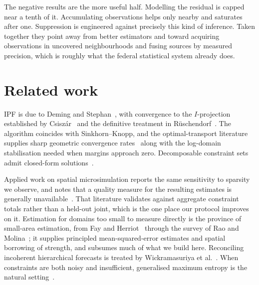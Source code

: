 \documentclass[11pt]{article}
\begin{document}
The negative results are the more useful half. Modelling the residual is capped
near a tenth of it. Accumulating observations helps only nearby and saturates
after one. Suppression is engineered against precisely this kind of inference.
Taken together they point away from better estimators and toward acquiring
observations in uncovered neighbourhoods and fusing sources by measured
precision, which is roughly what the federal statistical system already does.

\section{Related work}

IPF is due to Deming and Stephan~\cite{deming1940}, with convergence to the
$I$-projection established by Csisz\'ar~\cite{csiszar1975} and the definitive
treatment in R\"uschendorf~\cite{ruschendorf1995}. The algorithm coincides with
Sinkhorn--Knopp, and the optimal-transport literature supplies sharp geometric
convergence rates~\cite{sinkhornrate} along with the log-domain stabilisation
needed when margins approach zero. Decomposable constraint sets admit closed-form
solutions~\cite{decomposable}.

Applied work on spatial microsimulation reports the same sensitivity to sparsity
we observe, and notes that a quality measure for the resulting estimates is
generally unavailable~\cite{jasss2015}. That literature validates against
aggregate constraint totals rather than a held-out joint, which is the one place
our protocol improves on it. Estimation for domains too small to measure directly
is the province of small-area estimation, from Fay and
Herriot~\cite{fayherriot1979} through the survey of Rao and
Molina~\cite{rao2015}; it supplies principled mean-squared-error estimates and
spatial borrowing of strength, and subsumes much of what we build here.
Reconciling incoherent hierarchical forecasts is treated by Wickramasuriya et
al.~\cite{mint}. When constraints are both noisy and insufficient, generalised
maximum entropy is the natural setting~\cite{golan1996}.
\end{document}
